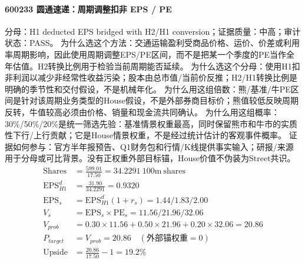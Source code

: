 \paragraph{600233 圆通速递：周期调整扣非 EPS / PE}
分母：H1 deducted EPS bridged with H2/H1 conversion；证据质量：中高；审计状态：PASS。
为什么选这个方法：交通运输盈利受商品价格、运价、价差或利用率周期影响，因此使用周期调整EPS/PE区间，而不是把某一个季度的PE当作全年估值。H2转换比例用于检验当前周期能否延续。
为什么选这个分母：使用H1扣非利润以减少非经常性收益污染；股本由总市值/当前价反推；H2/H1转换比例是明确的季节性和交付假设，不是机械年化。
为什么用这组倍数：熊/基准/牛PE区间是针对该周期业务类型的House假设，不是外部券商目标价；熊值较低反映周期反转，牛值较高必须由价格、销量和现金流共同确认。
为什么用这组概率：30\%/50\%/20\%是统一筛选先验：基准情景权重最高，同时保留熊市和牛市的实质性下行/上行贡献；它是House情景权重，不是经过统计估计的客观事件概率。
证据如何参与：官方半年报预告、Q1财务包和行情/K线提供事实输入；研报/来源用于分母或可比背景。没有正权重外部目标锚，House价值不伪装为Street共识。
\begin{align*}
\mathrm{Shares} &= \frac{599.01}{17.50}=34.2291\ \mathrm{100m\ shares}\\
\mathrm{EPS}_{H1}^d &= \frac{31.90}{34.2291}=0.9320\\
\mathrm{EPS}_s &= \mathrm{EPS}_{H1}^d(1+r_s)=1.44/1.83/2.00\\
V_s &= \mathrm{EPS}_s\times \mathrm{PE}_s=11.56/21.96/32.06\\
V_{prob} &= 0.30\times 11.56+0.50\times 21.96+0.20\times 32.06=20.86\\
P_{target} &= V_{prob}=20.86\quad(\text{外部锚权重}=0)\\
\mathrm{Upside} &= \frac{20.86}{17.50}-1=19.2\%\\
\end{align*}

